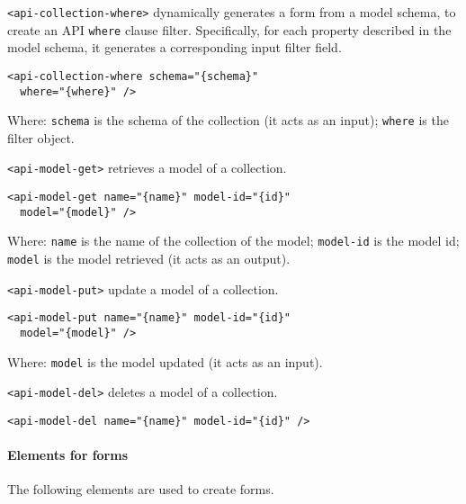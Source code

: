 \vspace{0.2cm}

\texttt{<api-collection-where>} dynamically generates a form from a model schema, to create an API \texttt{where} clause filter. Specifically, for each property described in the model schema, it generates a corresponding input filter field. 

\begin{lstlisting}[language=HTML5]
<api-collection-where schema="{schema}"
  where="{where}" />
\end{lstlisting}

Where: \texttt{schema} is the schema of the collection (it acts as an input);
\texttt{where} is the filter object.

\vspace{0.2cm}

\texttt{<api-model-get>} retrieves a model of a collection. 

\begin{lstlisting}[language=HTML5]
<api-model-get name="{name}" model-id="{id}" 
  model="{model}" />
\end{lstlisting}

Where: 
\texttt{name} is the name of the collection of the model; 
\texttt{model-id} is the model id; 
\texttt{model} is the model retrieved (it acts as an output).

\vspace{0.2cm}

\texttt{<api-model-put>} update a model of a collection. 

\begin{lstlisting}[language=HTML5]
<api-model-put name="{name}" model-id="{id}" 
  model="{model}" />
\end{lstlisting}

Where: 
\texttt{model} is the model updated (it acts as an input).

\vspace{0.2cm}

\texttt{<api-model-del>} deletes a model of a collection. 

\begin{lstlisting}[language=HTML5]
<api-model-del name="{name}" model-id="{id}" />
\end{lstlisting}

\paragraph{Elements for forms}
The following elements are used to create forms. 

